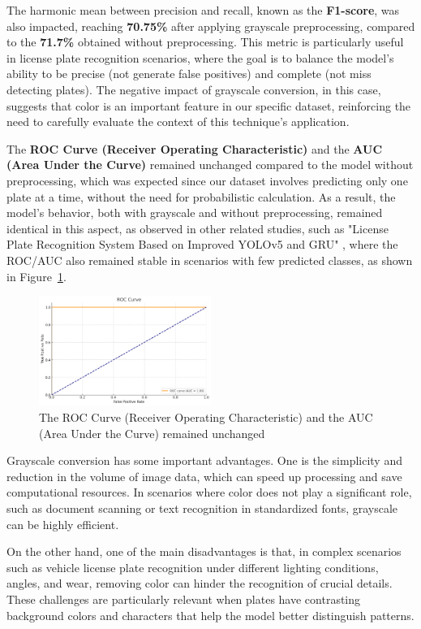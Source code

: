 \documentclass[conference]{IEEEtran}
\begin{document}
	The harmonic mean between precision and recall, known as the \textbf{F1-score}, was also impacted, reaching \textbf{70.75\%} after applying grayscale preprocessing, compared to the \textbf{71.7\%} obtained without preprocessing. This metric is particularly useful in license plate recognition scenarios, where the goal is to balance the model's ability to be precise (not generate false positives) and complete (not miss detecting plates). The negative impact of grayscale conversion, in this case, suggests that color is an important feature in our specific dataset, reinforcing the need to carefully evaluate the context of this technique's application.
	
	The \textbf{ROC Curve (Receiver Operating Characteristic)} and the \textbf{AUC (Area Under the Curve)} remained unchanged compared to the model without preprocessing, which was expected since our dataset involves predicting only one plate at a time, without the need for probabilistic calculation. As a result, the model's behavior, both with grayscale and without preprocessing, remained identical in this aspect, as observed in other related studies, such as "License Plate Recognition System Based on Improved YOLOv5 and GRU" \cite{b8}, where the ROC/AUC also remained stable in scenarios with few predicted classes, as shown in Figure~\ref{img7}.
	
	\begin{figure}[htbp]
		\centerline{\includegraphics[width=0.5\textwidth]{img7.png}}
		\caption{The ROC Curve (Receiver Operating Characteristic) and the AUC (Area Under the Curve) remained unchanged}
		\label{img7}
	\end{figure}
	
	Grayscale conversion has some important advantages. One is the simplicity and reduction in the volume of image data, which can speed up processing and save computational resources. In scenarios where color does not play a significant role, such as document scanning or text recognition in standardized fonts, grayscale can be highly efficient.
	
	On the other hand, one of the main disadvantages is that, in complex scenarios such as vehicle license plate recognition under different lighting conditions, angles, and wear, removing color can hinder the recognition of crucial details. These challenges are particularly relevant when plates have contrasting background colors and characters that help the model better distinguish patterns.
	
\end{document}
